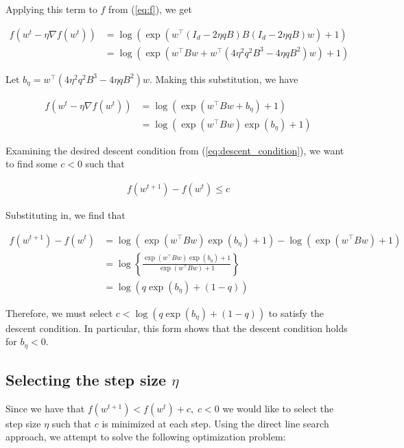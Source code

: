 \documentclass[11pt]{article}
\begin{document}
Applying this term to $f$ from (\ref{eq:f}), we get

\begin{equation}
\begin{split}
    f(w^t - \eta \nabla f(w^t)) 
    &= \log(\exp(w^{\top}(I_d - 2 \eta qB)B(I_d - 2 \eta qB)w) + 1) \\
    &= \log(\exp(w^{\top}Bw + w^{\top} ( 4 \eta^2 q^2 B^3 - 4 \eta q B^2)w) + 1)
\end{split}
\end{equation}

Let $b_\eta = w^{\top} ( 4 \eta^2 q^2 B^3 - 4 \eta q B^2)w$. Making this substitution, we have

\begin{equation}
\begin{split}
    f(w^t - \eta \nabla f(w^t)) 
    &= \log(\exp(w^{\top}Bw + b_\eta ) + 1) \\
    &= \log(\exp(w^{\top}Bw)\exp(b_\eta ) + 1)
\end{split}
\end{equation}

Examining the desired descent condition from (\ref{eq:descent_condition}), we want to find some $c < 0$ such that

\begin{align*}
    f(w^{t+1}) - f(w^t) \leq c
\end{align*}

Substituting in, we find that

\begin{align*}
    f(w^{t+1}) - f(w^t) &= 
    \log(\exp(w^{\top}Bw)\exp(b_\eta ) + 1) - \log(\exp(w^{\top}Bw) + 1) \\
    &= \log \left\{ \frac{\exp(w^{\top}Bw)\exp(b_\eta ) + 1}{\exp(w^{\top}Bw) + 1} \right\} \\
    &= \log( q \exp(b_\eta ) + (1 - q))
\end{align*}

Therefore, we must select $c < \log( q \exp(b_\eta ) + (1 - q))$ to satisfy the descent condition. In particular, this form shows that the descent condition holds for $b_\eta < 0$.

\subsection{Selecting the step size $\eta$}

Since we have that $f(w^{t+1}) < f(w^t) + c, \; c < 0$ we would like to select the step size $\eta$ such that $c$ is minimized at each step. Using the direct line search approach, we attempt to solve the following optimization problem:
\end{document}
